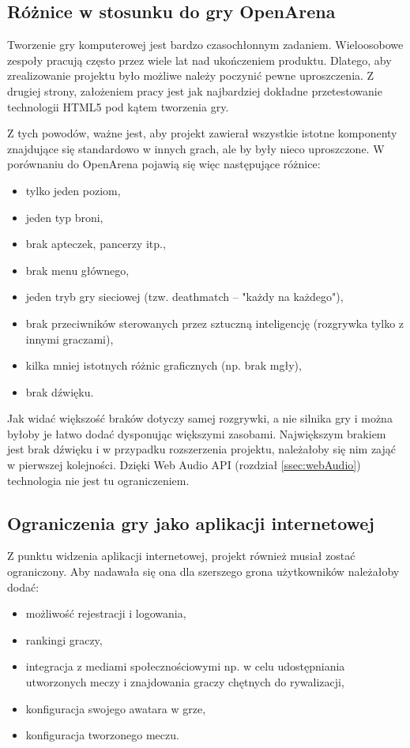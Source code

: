 \subsection {Różnice w stosunku do gry OpenArena}

Tworzenie gry komputerowej jest bardzo czasochłonnym zadaniem. Wieloosobowe zespoły pracują
często przez wiele lat nad ukończeniem produktu. Dlatego, aby zrealizowanie projektu było
możliwe należy poczynić pewne uproszczenia.
Z drugiej strony, założeniem pracy jest jak najbardziej dokładne przetestowanie
technologii HTML5 pod kątem tworzenia gry.

Z tych powodów, ważne jest, aby projekt zawierał wszystkie istotne komponenty znajdujące się
standardowo w innych grach, ale by były nieco uproszczone. W porównaniu do OpenArena pojawią
się więc następujące różnice:

\begin{itemize}
\item tylko jeden poziom,
\item jeden typ broni,
\item brak apteczek, pancerzy itp.,
\item brak menu głównego,
\item jeden tryb gry sieciowej (tzw. deathmatch -- "każdy na każdego"),
\item brak przeciwników sterowanych przez sztuczną inteligencję (rozgrywka tylko z innymi graczami),
\item kilka mniej istotnych różnic graficznych (np. brak mgły),
\item brak dźwięku.
\end{itemize}

Jak widać większość braków dotyczy samej rozgrywki, a nie silnika gry i można byłoby je
łatwo dodać dysponując większymi zasobami. Największym brakiem jest brak dźwięku i w przypadku
rozszerzenia projektu, należałoby się nim zająć w pierwszej kolejności. Dzięki Web Audio API
(rozdział \ref{ssec:webAudio}) technologia nie jest tu ograniczeniem.

\subsection {Ograniczenia gry jako aplikacji internetowej}

Z punktu widzenia aplikacji internetowej, projekt również musiał zostać ograniczony. Aby
nadawała się ona dla szerszego grona użytkowników należałoby dodać:
\begin{itemize}
\item możliwość rejestracji i logowania,
\item rankingi graczy,
\item integracja z mediami społecznościowymi np. w celu udostępniania utworzonych meczy i
  znajdowania graczy chętnych do rywalizacji,
\item konfiguracja swojego awatara w grze,
\item konfiguracja tworzonego meczu.
\end{itemize}

